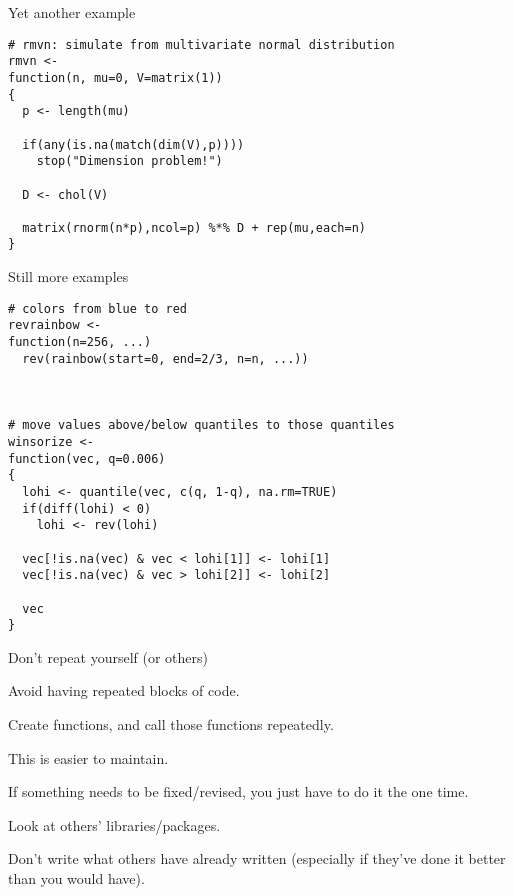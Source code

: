 \documentclass[12pt,t]{beamer}
\begin{document}
\begin{frame}[fragile,c]{Yet another example}

\begin{lstlisting}
# rmvn: simulate from multivariate normal distribution
rmvn <-
function(n, mu=0, V=matrix(1))
{
  p <- length(mu)

  if(any(is.na(match(dim(V),p))))
    stop("Dimension problem!")

  D <- chol(V)

  matrix(rnorm(n*p),ncol=p) %*% D + rep(mu,each=n)
}
\end{lstlisting}
\end{frame}

\begin{frame}[fragile,c]{Still more examples}

\begin{lstlisting}
# colors from blue to red
revrainbow <-
function(n=256, ...)
  rev(rainbow(start=0, end=2/3, n=n, ...))  



# move values above/below quantiles to those quantiles
winsorize <- 
function(vec, q=0.006)
{
  lohi <- quantile(vec, c(q, 1-q), na.rm=TRUE)
  if(diff(lohi) < 0)
    lohi <- rev(lohi)
  
  vec[!is.na(vec) & vec < lohi[1]] <- lohi[1]
  vec[!is.na(vec) & vec > lohi[2]] <- lohi[2]

  vec
}
\end{lstlisting}

\end{frame}


\begin{frame}{Don't repeat yourself (or others)}

\bbi
\item Avoid having repeated blocks of code.
\item Create functions, and call those functions repeatedly.
\item This is easier to maintain.
  \bi
  \item If something needs to be fixed/revised, you just have to do it
    the one time.
  \ei
\item Look at others' libraries/packages.
  \bi
  \item Don't write what others have already written (especially if
    they've done it better than you would have).
  \ei
\ei

\end{frame}
\end{document}
